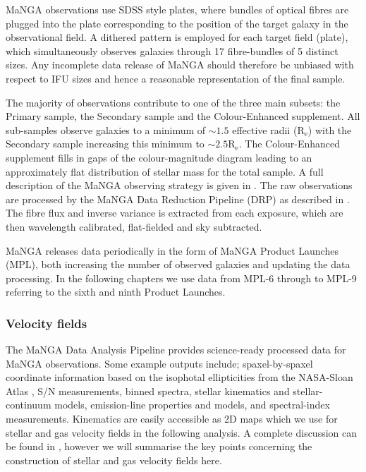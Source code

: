 MaNGA observations use SDSS style plates, where bundles of optical fibres are plugged into the plate corresponding to the position of the target galaxy in the observational field. A dithered pattern is employed for each target field (plate), which simultaneously observes galaxies through 17 fibre-bundles of 5 distinct sizes. Any incomplete data release of MaNGA should therefore be unbiased with respect to IFU sizes and hence a reasonable representation of the final sample.

The majority of observations contribute to one of the three main subsets: the Primary sample, the Secondary sample and the Colour-Enhanced supplement. All sub-samples observe galaxies to a minimum of $\sim 1.5$ effective radii ($\mathrm{R_{e}}$) with the Secondary sample increasing this minimum to $\sim 2.5 \mathrm{R_{e}}$. The Colour-Enhanced supplement fills in gaps of the colour-magnitude diagram leading to an approximately flat distribution of stellar mass for the total sample. A full description of the MaNGA observing strategy is given in \citet{law2015obs,yan2016obs}. The raw observations are processed by the MaNGA Data Reduction Pipeline (DRP) as described in \citet{law2016drp, yan2016spec}. The fibre flux and inverse variance is extracted from each exposure, which are then wavelength calibrated, flat-fielded and sky subtracted.

MaNGA releases data periodically in the form of MaNGA Product Launches (MPL), both increasing the number of observed galaxies and updating the data processing. In the following chapters we use data from MPL-6 through to MPL-9 referring to the sixth and ninth Product Launches.
 
\subsubsection{Velocity fields} \label{sec:vel_fields_intro}
The MaNGA Data Analysis Pipeline \citep[DAP][]{westfall2019,belfiore2019} provides science-ready processed data for MaNGA observations. Some example outputs include; spaxel-by-spaxel coordinate information based on the isophotal ellipticities from the NASA-Sloan Atlas \cite[NSA; used for target selection in MaNGA;][]{blanton2011}, S/N measurements, binned spectra, stellar kinematics and stellar-continuum models, emission-line properties and models, and spectral-index measurements. Kinematics are easily accessible as 2D maps which we use for stellar and gas velocity fields in the following analysis. A complete discussion can be found in \citet{westfall2019,belfiore2019}, however we will summarise the key points concerning the construction of stellar and gas velocity fields here.

